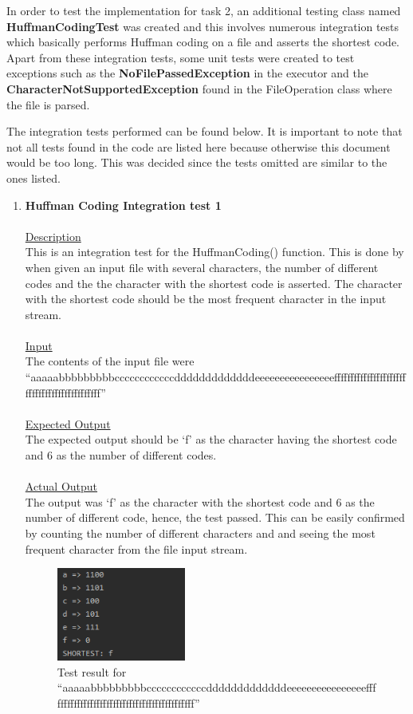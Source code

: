 \documentclass{article}
\newcommand{\quotes}[1]{``#1''}
\begin{document}
In order to test the implementation for task 2, an additional testing class named \textbf{HuffmanCodingTest} was created and this involves numerous integration tests which basically performs Huffman coding on a file and asserts the shortest code. Apart from these integration tests, some unit tests  were created to test exceptions such as the \textbf{NoFilePassedException} in the executor and the \textbf{CharacterNotSupportedException} found in the FileOperation class where the file is parsed.

The integration tests performed can be found below. It is important to note that not all tests found in the code are listed here because otherwise this document would be too long. This was decided since the tests omitted are similar to the ones listed.

\begin{enumerate}
	\item \textbf{Huffman Coding Integration test 1}\\\\
		\underline{Description}\\
		\indent This is an integration test for the HuffmanCoding() function. This is done by when given an input file with several characters, the number of different codes and the the character with the shortest code is asserted. The character with the shortest code should be the most frequent character in the input stream.\\\\
		\underline{Input}\\
		\indent The contents of the input file were \quotes{aaaaabbbbbbbbbccccccccccccdddddddddddddeeeeeeeeeeeeeeeefffffffffffffffffffffffffffffffffffffffffffff}\\	\\
		\underline{Expected Output}\\
		\indent The expected output should be `f' as the character having the shortest code and 6 as the number of different codes.\\\\
		\underline{Actual Output}\\
		The output was `f' as the character with the shortest code and 6 as the number of different code, hence, the test passed. This can be easily confirmed by counting the number of different characters and and seeing the most frequent character from the file input stream.
			\begin{figure}[H]
					\centering
			 			\includegraphics[width=0.4\textwidth]{hctest1.png}
			 			\centering
			  			\caption{Test result for \quotes{aaaaabbbbbbbbbccccccccccccdddddddddddddeeeeeeeeeeeeeeeefffffffffffffffffffffffffffffffffffffffffffff}}
			  			\label{fig:dplltest1}
					\end{figure}
					

\end{enumerate}
\end{document}
